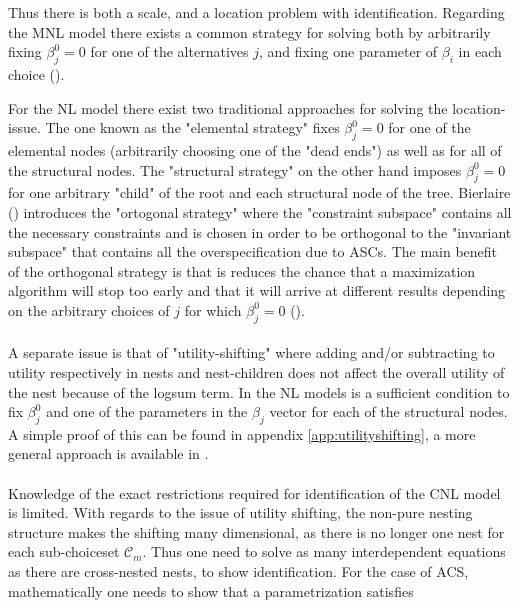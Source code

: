 Thus there is both a scale, and a location problem with identification. Regarding the MNL model there exists a common strategy for solving both by arbitrarily fixing $\beta^0_j=0$ for one of the alternatives $j$, and fixing one parameter of $\beta_i$ in each choice (\cite{ben-akiva_discrete_1985}).

For the NL model there exist two traditional approaches for solving the location-issue. The one known as the "elemental strategy" fixes $\beta^0_j=0$ for one of the elemental nodes (arbitrarily choosing one of the "dead ends") as well as for all of the structural nodes. The "structural strategy" on the other hand imposes $\beta^0_j=0$ for one arbitrary "child" of the root and each structural node of the tree. Bierlaire (\citeyear{bierlaire_overspecification_1997}) introduces the "ortogonal strategy" where the "constraint subspace" contains all the necessary constraints and is chosen in order to be orthogonal to the "invariant subspace" that contains all the overspecification due to ASCs. The main benefit of the orthogonal strategy is  that is reduces the chance that a maximization algorithm will stop too early and that it will arrive at different results depending on the arbitrary choices of $j$ for which $\beta^0_j=0$ (\cite{bierlaire_overspecification_1997}).
\\ \\
A separate issue is that of "utility-shifting" where adding and/or subtracting to utility respectively in nests and nest-children does not affect the overall utility of the nest because of the logsum term. In the NL models is a sufficient condition to fix $\beta^0_j$ and one of the parameters in the $\beta_j$ vector for each of the structural nodes. A simple proof of this can be found in appendix \ref{app:utilityshifting}, a more general approach is available in \citep{bierlaire_overspecification_1997}.
\\ \\
Knowledge of the exact restrictions required for identification of the CNL model is limited. With regards to the issue of utility shifting, the non-pure nesting structure makes the shifting many dimensional, as there is no longer one nest for each sub-choiceset $\mathcal{C}_m$. Thus one need to solve as many interdependent equations as there are cross-nested nests, to show identification. For the case of ACS, mathematically one needs to show that a parametrization satisfies

